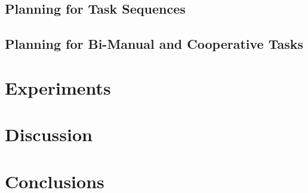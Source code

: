 \documentclass{aamas2015}
\begin{document}

\newpage 
\subsection{Planning for Task Sequences}

\newpage
\subsection{Planning for Bi-Manual and Cooperative Tasks}

\newpage
\section{Experiments}
 
 \newpage
\section{Discussion}
\newpage
\section{Conclusions}
\end{document}
